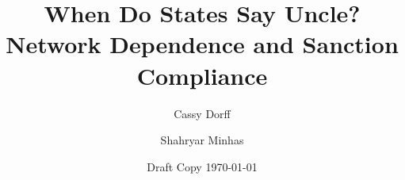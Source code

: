 \documentclass[12pt,onesided]{amsart}
\title[Network Dependence and Sanction Compliance]{When Do States Say Uncle? Network Dependence and Sanction Compliance}
\date{Draft Copy \today}
\author[Dorff]{Cassy Dorff}
\author[Minhas]{Shahryar Minhas}
\begin{document}
\maketitle\thispagestyle{empty}

\begin{abstract}

\singlespacing{}

\end{abstract}

\newpage\setcounter{page}{1}













\newpage


\end{document}
